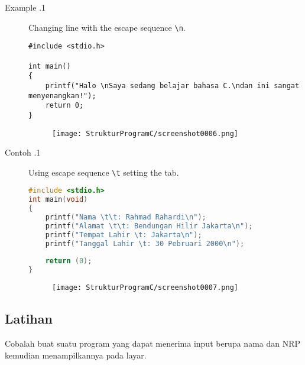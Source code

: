 \begin{description}
	\item[Example \thesection.1] Changing line with the escape sequence \verb*|\n|.
	\begin{lstlisting}
#include <stdio.h>

int main() 
{
	printf("Halo \nSaya sedang belajar bahasa C.\ndan ini sangat menyenangkan!");
	return 0;
}
	\end{lstlisting}
\begin{figure}[H]
	\centering
	\texttt{[image: StrukturProgramC/screenshot0006.png]}
	\caption{}
	\label{fig:screenshot0006}
\end{figure}

\item[Contoh \thesection.1] Using escape sequence \verb*|\t| setting the tab.
\begin{lstlisting}[language=c]
#include <stdio.h>
int main(void)
{
	printf("Nama \t\t: Rahmad Rahardi\n");
	printf("Alamat \t\t: Bendungan Hilir Jakarta\n");
	printf("Tempat Lahir \t: Jakarta\n");
	printf("Tanggal Lahir \t: 30 Pebruari 2000\n");
	
	return (0);
}
\end{lstlisting}
\begin{figure}[H]
	\centering
	\texttt{[image: StrukturProgramC/screenshot0007.png]}
	\caption{}
	\label{fig:screenshot0007}
\end{figure}
\end{description}

\subsection{Latihan}
Cobalah buat suatu program yang dapat menerima input berupa nama dan NRP kemudian menampilkannya pada layar.





